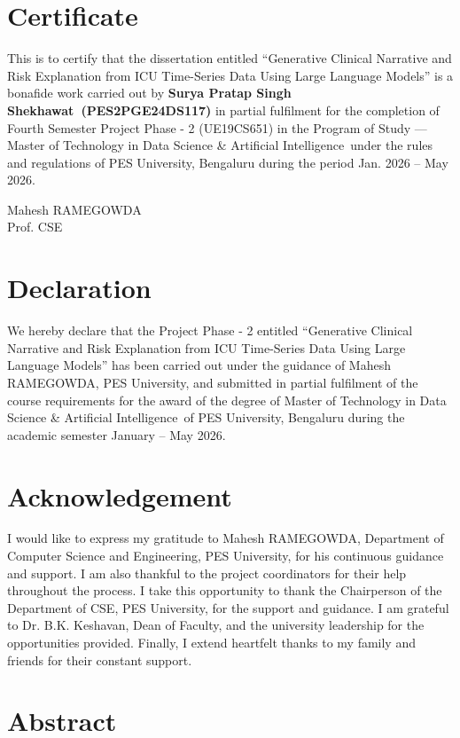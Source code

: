 \documentclass[12pt]{report}
\newcommand{\projecttitle}{Generative Clinical Narrative and Risk Explanation from ICU Time-Series Data Using Large Language Models}
\newcommand{\studentname}{Surya Pratap Singh Shekhawat}
\newcommand{\studentid}{PES2PGE24DS117}
\newcommand{\degreeprog}{Data Science \& Artificial Intelligence}
\newcommand{\guidename}{Mahesh RAMEGOWDA}
\begin{document}
\section*{Certificate}

This is to certify that the dissertation entitled ``\projecttitle'' is a bonafide work carried out by \textbf{\studentname\ (\studentid)} in partial fulfilment for the completion of Fourth Semester Project Phase - 2 (UE19CS651) in the Program of Study --- Master of Technology in \degreeprog\ under the rules and regulations of PES University, Bengaluru during the period Jan. 2026 -- May 2026.

\vspace{2cm}

\begin{flushright}
\guidename\\
Prof. CSE
\end{flushright}

\newpage

\section*{Declaration}

We hereby declare that the Project Phase - 2 entitled ``\projecttitle'' has been carried out under the guidance of \guidename, PES University, and submitted in partial fulfilment of the course requirements for the award of the degree of Master of Technology in \degreeprog\ of PES University, Bengaluru during the academic semester January -- May 2026.

\newpage

\section*{Acknowledgement}

I would like to express my gratitude to \guidename, Department of Computer Science and Engineering, PES University, for his continuous guidance and support. I am also thankful to the project coordinators for their help throughout the process. I take this opportunity to thank the Chairperson of the Department of CSE, PES University, for the support and guidance. I am grateful to Dr. B.K. Keshavan, Dean of Faculty, and the university leadership for the opportunities provided. Finally, I extend heartfelt thanks to my family and friends for their constant support.

\newpage

\section*{Abstract}
\end{document}
